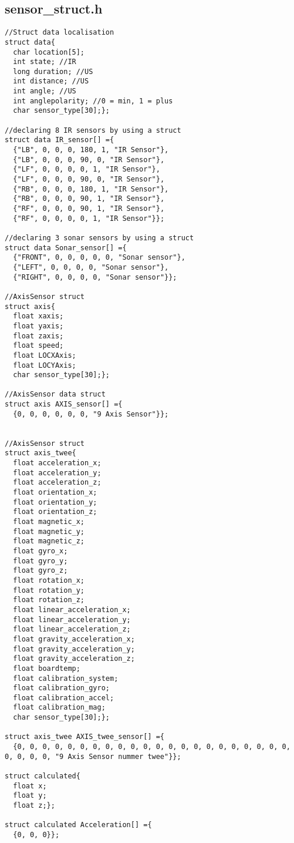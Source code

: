 \subsection{sensor\_struct.h}
\begin{lstlisting}
//Struct data localisation
struct data{
  char location[5];
  int state; //IR
  long duration; //US
  int distance; //US
  int angle; //US
  int anglepolarity; //0 = min, 1 = plus 
  char sensor_type[30];};

//declaring 8 IR sensors by using a struct
struct data IR_sensor[] ={
  {"LB", 0, 0, 0, 180, 1, "IR Sensor"},
  {"LB", 0, 0, 0, 90, 0, "IR Sensor"},
  {"LF", 0, 0, 0, 0, 1, "IR Sensor"},
  {"LF", 0, 0, 0, 90, 0, "IR Sensor"},
  {"RB", 0, 0, 0, 180, 1, "IR Sensor"},
  {"RB", 0, 0, 0, 90, 1, "IR Sensor"},
  {"RF", 0, 0, 0, 90, 1, "IR Sensor"},
  {"RF", 0, 0, 0, 0, 1, "IR Sensor"}};

//declaring 3 sonar sensors by using a struct
struct data Sonar_sensor[] ={ 
  {"FRONT", 0, 0, 0, 0, 0, "Sonar sensor"},
  {"LEFT", 0, 0, 0, 0, "Sonar sensor"},
  {"RIGHT", 0, 0, 0, 0, "Sonar sensor"}};

//AxisSensor struct
struct axis{
  float xaxis;
  float yaxis;
  float zaxis;
  float speed;
  float LOCXAxis;
  float LOCYAxis;
  char sensor_type[30];};

//AxisSensor data struct
struct axis AXIS_sensor[] ={
  {0, 0, 0, 0, 0, 0, "9 Axis Sensor"}};


//AxisSensor struct
struct axis_twee{
  float acceleration_x;
  float acceleration_y;
  float acceleration_z;
  float orientation_x;
  float orientation_y;
  float orientation_z;
  float magnetic_x;
  float magnetic_y;
  float magnetic_z;
  float gyro_x;
  float gyro_y;
  float gyro_z;
  float rotation_x;
  float rotation_y;
  float rotation_z;
  float linear_acceleration_x;
  float linear_acceleration_y;
  float linear_acceleration_z;
  float gravity_acceleration_x;
  float gravity_acceleration_y;
  float gravity_acceleration_z;
  float boardtemp;
  float calibration_system;
  float calibration_gyro;
  float calibration_accel;
  float calibration_mag;
  char sensor_type[30];};

struct axis_twee AXIS_twee_sensor[] ={
  {0, 0, 0, 0, 0, 0, 0, 0, 0, 0, 0, 0, 0, 0, 0, 0, 0, 0, 0, 0, 0, 0, 0, 0, 0, 0, "9 Axis Sensor nummer twee"}};

struct calculated{
  float x;
  float y;
  float z;};

struct calculated Acceleration[] ={
  {0, 0, 0}};
\end{lstlisting}
